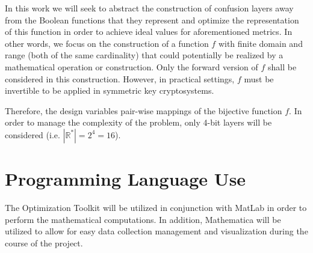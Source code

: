 \documentclass[11pt]{article}
\begin{document}
In this work we will seek to abstract the construction of confusion layers away from the Boolean functions that they represent and optimize the representation of this function in order to achieve ideal values for aforementioned metrics. In other words, we focus on the construction of a function $f$ with finite domain and range (both of the same cardinality) that could potentially be realized by a mathematical operation or construction. Only the forward version of $f$ shall be considered in this construction. However, in practical settings, $f$ must be invertible to be applied in symmetric key cryptosystems. 

Therefore, the design variables pair-wise mappings of the bijective function $f$. In order to manage the complexity of the problem, only 4-bit layers will be considered (i.e. $|\mathbb{R^*}| = 2^4 = 16$).

\section{Programming Language Use}
The Optimization Toolkit will be utilized in conjunction with MatLab in order to perform the mathematical computations. In addition, Mathematica will be utilized to allow for easy data collection management and visualization during the course of the project. 



\end{document}
